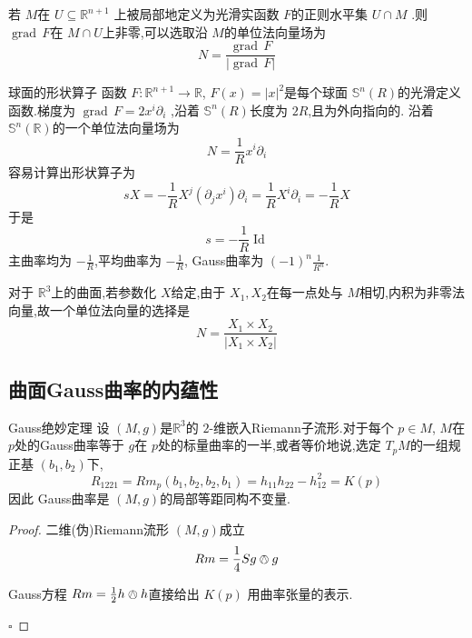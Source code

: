 \documentclass[../../几何与拓扑.tex]{subfiles}
\begin{document}
\begin{proposition}
    若 \(  M  \)在 \(  U  \subseteq \mathbb{R} ^{n+ 1}\) 上被局部地定义为光滑实函数 \(  F  \)的正则水平集 \(  U\cap M  \) .则 \(  \operatorname{grad}\,F  \)在 \(  M\cap U  \)上非零,可以选取沿 \(  M  \)的单位法向量场为 \[
    N=  \frac{\operatorname{grad}\,F }{\left| \operatorname{grad}\,F \right|  } 
    \]     
\end{proposition}

\begin{example}{球面的形状算子}
    函数 \(  F:\mathbb{R} ^{n+ 1}\to \mathbb{R}   \), \(  F\left( x \right)= \left| x \right|^{2}    \)是每个球面 \(  \mathbb{S}^{n}\left( R \right)   \)的光滑定义函数.梯度为 \(  \operatorname{grad}\,F  = 2 x^{i} \partial _{i}\)    ,沿着 \(  \mathbb{S}^{n}\left( R \right)   \)长度为 \(  2R  \),且为外向指向的. 沿着 \(  \mathbb{S}^{n}\left( \mathbb{R}  \right)   \)的一个单位法向量场为 \[
     N =  \frac{1}{R}x^{i} \partial _{i}
    \]   容易计算出形状算子为 \[
    sX = - \frac{1}{R} X^{j} \left(  \partial _{j}x^{i} \right) \partial _{i}= \frac{1}{R}X^{i} \partial _{i}= -\frac{1}{R}X 
    \]于是 \[
    s =  -\frac{1 }{R }\operatorname{Id} 
    \]主曲率均为 \(  -\frac{1 }{R }   \),平均曲率为 \(  - \frac{1 }{R }   \),  Gauss曲率为 \(  \left( -1 \right)^{n} \frac{1 }{R^{n} }    \).    
\end{example}

\hspace*{\fill} 


\begin{proposition}
    对于 \(  \mathbb{R} ^{3}  \)上的曲面,若参数化 \(  X  \)给定,由于 \(  X_1,X_2  \)在每一点处与 \(  M  \)相切,内积为非零法向量,故一个单位法向量的选择是 \[
    N =  \frac{X_1\times X_2 }{\left| X_1\times X_2 \right|  } 
    \]    
\end{proposition}

\subsection{曲面Gauss曲率的内蕴性}


\begin{theorem}{Gauss绝妙定理}
    设 \(  \left( M,g \right)   \)是\(  \mathbb{R} ^{3}  \)的 \(  2  \)-维嵌入Riemann子流形.对于每个 \(  p \in M  \), \(  M  \)在 \(  p  \)处的Gauss曲率等于 \(  g  \)在 \(  p  \)处的标量曲率的一半,或者等价地说,选定 \(  T_{p}M  \)的一组规正基 \(  \left( b_1,b_2 \right)   \)下,   \[
    R_{1221}=  Rm_{p}\left( b_1,b_2,b_2,b_1 \right) = h_{11}h_{22}-h_{12}^{2}=  K\left( p \right) 
    \]因此 Gauss曲率是 \(  \left( M,g \right)   \)的局部等距同构不变量.         
\end{theorem}
\begin{proof}
    二维(伪)Riemann流形 \(  \left( M,g \right)   \)成立 \[
    Rm = \frac{1 }{4 }S g\owedge g 
    \] 

    Gauss方程  \(  Rm=  \frac{1}{2}h \owedge h  \)直接给出 \(  K\left( p \right)   \)  用曲率张量的表示.

    \hfill $\square$
\end{proof}
\end{document}
